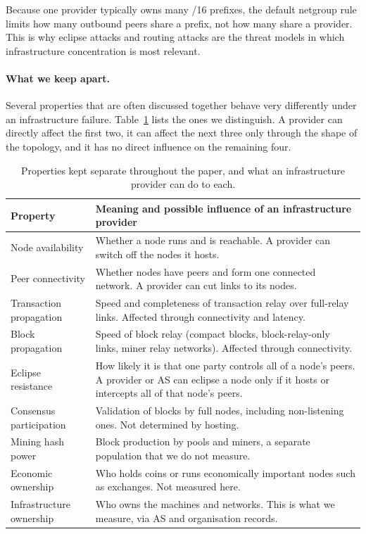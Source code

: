 \documentclass[10pt,a4paper]{article}
\begin{document}
Because one provider typically owns many /16 prefixes, the default netgroup rule limits how many outbound peers share a prefix, not how many share a provider. This is why eclipse attacks \cite{heilman2015eclipse} and routing attacks \cite{apostolaki2017hijacking,tran2020erebus} are the threat models in which infrastructure concentration is most relevant.

\paragraph{What we keep apart.} Several properties that are often discussed together behave very differently under an infrastructure failure. Table~\ref{tab:dimensions} lists the ones we distinguish. A provider can directly affect the first two, it can affect the next three only through the shape of the topology, and it has no direct influence on the remaining four.

\begin{table}[t]\centering\small
\caption{Properties kept separate throughout the paper, and what an infrastructure provider can do to each.}\label{tab:dimensions}
\begin{tabularx}{\textwidth}{lX}
\toprule
Property & Meaning and possible influence of an infrastructure provider\\
\midrule
Node availability & Whether a node runs and is reachable. A provider can switch off the nodes it hosts.\\
Peer connectivity & Whether nodes have peers and form one connected network. A provider can cut links to its nodes.\\
Transaction propagation & Speed and completeness of transaction relay over full-relay links. Affected through connectivity and latency.\\
Block propagation & Speed of block relay (compact blocks, block-relay-only links, miner relay networks). Affected through connectivity.\\
Eclipse resistance & How likely it is that one party controls all of a node's peers. A provider or AS can eclipse a node only if it hosts or intercepts all of that node's peers.\\
Consensus participation & Validation of blocks by full nodes, including non-listening ones. Not determined by hosting.\\
Mining hash power & Block production by pools and miners, a separate population that we do not measure.\\
Economic ownership & Who holds coins or runs economically important nodes such as exchanges. Not measured here.\\
Infrastructure ownership & Who owns the machines and networks. This is what we measure, via AS and organisation records.\\
\bottomrule
\end{tabularx}
\end{table}
\end{document}
